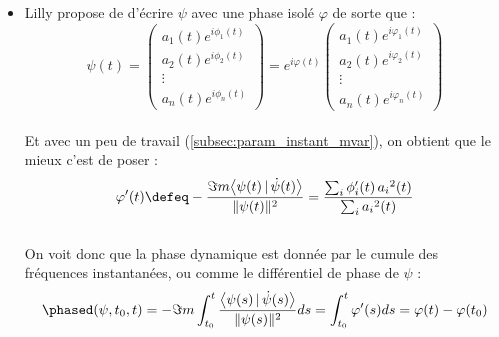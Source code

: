 \begin{itemize}
	\item Lilly \cite{lilly_analysis_2012} propose de d'écrire $\psi$ avec une phase isolé $\varphi$ de sorte que :
	\[\psi(t) = \begin{pmatrix} a_1(t)e^{i\phi_1(t)} \\ a_2(t)e^{i\phi_2(t)} \\ \vdots \\ a_n(t)e^{i\phi_n(t)}
	\end{pmatrix} = e^{i\varphi(t)}\begin{pmatrix} a_1(t)e^{i\varphi_1(t)} \\ a_2(t)e^{i\varphi_2(t)} \\ \vdots \\ a_n(t)e^{i\varphi_n(t)}
	\end{pmatrix}\]
	\\
	Et avec un peu de travail (\cref{subsec:param_instant_mvar}), on obtient que le mieux c'est de poser :
	\[\varphi'(t) \defeq -\frac{\Im m\big\langle \psi(t) \,|\, \dot{\psi}(t) \big\rangle}{\|\psi(t)\|^2} = \frac{\sum_i\phi_i'(t)\,{a_i}^2(t)}{\sum_i{a_i}^2(t)}\]
	\\
	On voit donc que la phase dynamique est donnée par le cumule des fréquences instantanées, ou comme le différentiel de phase de $\psi$ :
	\[\phased(\psi,t_0,t) = -\Im m\int_{t_0}^t \frac{\big\langle \psi(s) \,|\, \dot{\psi}(s) \big\rangle}{\|\psi(s)\|^2} ds = \int_{t_0}^t \varphi'(s)ds = \varphi(t)-\varphi(t_0)\]
	

\end{itemize}
